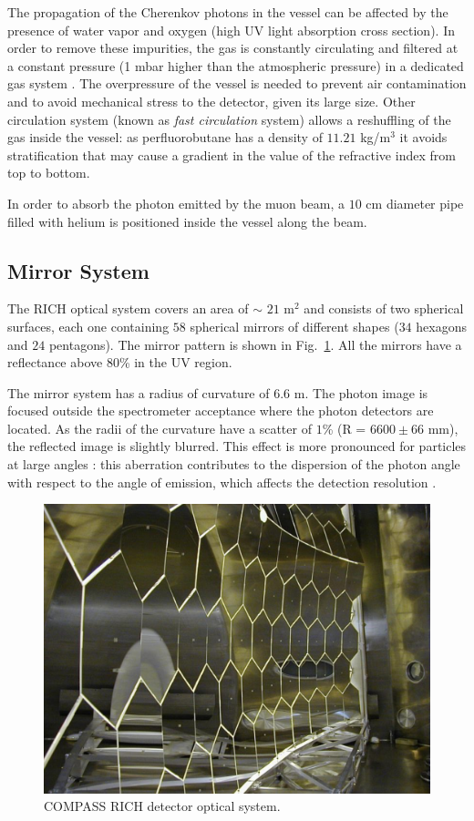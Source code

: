 The propagation of the Cherenkov photons in the vessel can be affected by the presence of water vapor and oxygen (high UV light absorption cross section). In order to remove these impurities, the gas is constantly circulating and filtered at a constant pressure (1 mbar higher than the atmospheric pressure) in a dedicated gas system \cite{RICHGas}. The overpressure of the vessel is needed to prevent air contamination and to avoid mechanical stress to the detector, given its large size. Other circulation system (known as \textit{fast circulation} system) allows a reshuffling of the gas inside the vessel: as perfluorobutane has a density of $11.21$ kg/m$^3$ it avoids stratification that may cause a gradient in the value of the refractive index from top to bottom.

In order to absorb the photon emitted by the muon beam, a $10$ cm diameter pipe filled with helium is positioned inside the vessel along the beam.

\subsection{Mirror System}

The RICH optical system covers an area of $\sim$ $21$ m$^2$ and consists of two spherical surfaces, each one containing $58$ spherical mirrors of different shapes ($34$ hexagons and $24$ pentagons). The mirror pattern is shown in Fig.~\ref{pic:RICHmirrors}. All the mirrors have a reflectance above $80$\% in the UV region.

The mirror system has a radius of curvature of $6.6$ m. The photon image is focused outside the spectrometer acceptance where the photon detectors are located. As the radii of the curvature have a scatter of $1$\% (R = $6600\pm66$ mm), the reflected image is slightly blurred. This effect is more pronounced for particles at large angles \cite{RICHMirror}: this aberration contributes to the dispersion of the photon angle with respect to the angle of emission, which affects the detection resolution \cite{RICHPID}.

\begin{figure}[!h]
  \centering
	\includegraphics[scale=0.4]{./gfx/RICHmirrors.png}
	\caption{COMPASS RICH detector optical system.}
	\label{pic:RICHmirrors}
\end{figure}

